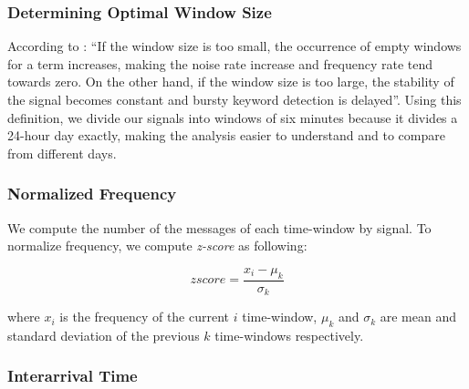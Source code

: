 \documentclass[sigconf]{acmart}
\begin{document}
\subsubsection{Determining Optimal Window Size}

According to \citeauthor{guzman2013line} \cite{guzman2013line}: ``If the window size is too small, the occurrence of empty windows for a term increases, making the noise rate increase and frequency rate tend towards zero. On the other hand, if the window size is too large, the stability of the signal becomes constant and bursty keyword detection is delayed''. Using this definition, we divide our signals into windows of six minutes because it divides a 24-hour day exactly, making the analysis easier to understand and to compare from different days.


\subsubsection{Normalized Frequency}
We compute the number of the messages of each time-window by signal. To normalize frequency, we compute \textit{z-score} as following:

\begin{equation} \label{eq:1}
zscore = \frac{x_{i} - \mu_{k} }{\sigma_{k}}
\end{equation}

where $x_{i}$ is the frequency of the current $i$ time-window, $\mu_{k}$ and  $\sigma_{k}$ are mean and standard deviation of the previous $k$ time-windows respectively.

\subsubsection{Interarrival Time}
\end{document}
